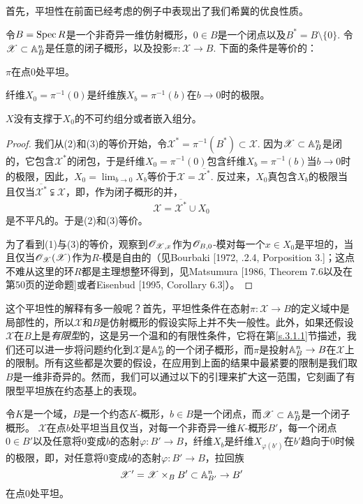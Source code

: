 首先，平坦性在前面已经考虑的例子中表现出了我们希冀的优良性质。

\begin{pro}\label{pro:2.29}
	令$B=\operatorname{Spec} R$是一个非奇异一维仿射概形，$0\in B$是一个闭点以及$B^*=B\setminus \{0\}$. 令$\mathscr{X}\subset \mathbb{A}_{B}^n$是任意的闭子概形，以及投影$\pi:\mathscr{X}\to B$. 下面的条件是等价的：
	\begin{compactenum}[\((1)\)]
		\item $\pi$在点$0$处平坦。
		\item 纤维$X_0=\pi^{-1}(0)$是纤维族$X_b=\pi^{-1}(b)$在$b\to 0$时的极限。
		\item $X$没有支撑于$X_0$的不可约组分或者嵌入组分。
	\end{compactenum}
\end{pro}

\begin{proof}
我们从(2)和(3)的等价开始，令$\mathscr{X}^*=\pi^{-1}(B^*)\subset \mathscr{X}$. 因为$\mathscr{X}\subset \mathbb{A}_B^n$是闭的，它包含$\mathscr{X}^*$的闭包，于是纤维$X_0=\pi^{-1}(0)$包含纤维$X_b=\pi^{-1}(b)$当$b\to 0$时的极限，因此，$X_0=\lim_{b\to 0} X_b$等价于$\mathscr{X}=\overline{\mathscr{X}^*}$. 反过来，$X_0$真包含$X_b$的极限当且仅当$\overline{\mathscr{X}^*} \subsetneqq \mathscr{X}$，即，作为闭子概形的并，
\[
	\mathscr{X}=\overline{\mathscr{X}^*}\cup X_0
\]
是不平凡的。于是(2)和(3)等价。

为了看到(1)与(3)的等价，观察到$\mathscr{O}_{\mathscr{X},x}$作为$\mathscr{O}_{B,0}$\hyp 模对每一个$x\in X_0$是平坦的，当且仅当$\mathscr{O}_{\mathscr{X}}(\mathscr{X})$作为$R$\hyp 模是自由的（见Bourbaki [1972, \uppercase\expandafter{}.2.4, Porposition 3.\expandafter{}]；这点不难从这里的环$R$都是主理想整环得到，见Matsumura [1986, Theorem 7.6以及在第50页的逆命题]或者Eisenbud [1995, Corollary 6.3]）。
\end{proof}

这个平坦性的解释有多一般呢？首先，平坦性条件在态射$\pi:\mathscr{X}\to B$的定义域\nottran 中是局部性的，所以$\mathscr{X}$和$B$是仿射概形的假设实际上并不失一般性。此外，如果还假设$\mathscr{X}$在$B$上是\textit{有限型}的，这是另一个温和的有限性条件，它将在第\ref{s.3.1.1}节描述，我们还可以进一步将问题约化到$\mathscr{X}$是$\mathbb{A}_B^n$的一个闭子概形，而$\pi$是投射$\mathbb{A}_B^n\to B$在$\mathscr{X}$上的限制。所有这些都是次要的假设，在应用到上面的结果中最紧要的限制是我们取$B$是一维非奇异的。然而，我们可以通过以下的引理来扩大这一范围，它刻画了有限型平坦族在约态基上的表现。

\begin{lem}
	令$K$是一个域，$B$是一个约态$K$\hyp 概形，$b\in B$是一个闭点，而$\mathscr{X}\subset \mathbb{A}_{B}^n$是一个闭子概形。 $\mathscr{X}$在点$b$处平坦当且仅当，对每一个非奇异一维$K$\hyp 概形$B'$，每一个闭点$0\in B'$以及任意将$0$变成$b$的态射$\varphi:B'\to B$，纤维$X_b$是纤维$X_{\varphi(b')}$在$b'$趋向于$0$时候的极限，即，对任意将$0$变成$b$的态射$\varphi:B'\to B$，拉回族
	\[
	\mathscr{X}'=\mathscr{X}\times_B B'\subset \mathbb{A}_{B'}^n\to B'
	\]
	在点$0$处平坦。
\end{lem}

